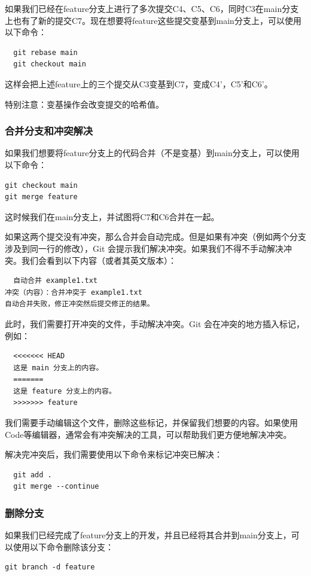 \documentclass[../main.tex]{subfiles}
\begin{document}
如果我们已经在feature分支上进行了多次提交C4、C5、C6，同时C3在main分支上也有了新的提交C7。现在想要将feature这些提交变基到main分支上，可以使用以下命令：
\begin{verbatim}
  git rebase main
  git checkout main
\end{verbatim}
这样会把上述feature上的三个提交从C3变基到C7，变成C4'，C5'和C6'。

特别注意：变基操作会改变提交的哈希值。

\subsubsection{合并分支和冲突解决}

如果我们想要将feature分支上的代码合并（不是变基）到main分支上，可以使用以下命令：

\begin{verbatim}
git checkout main
git merge feature
\end{verbatim}

这时候我们在main分支上，并试图将C7和C6合并在一起。

如果这两个提交没有冲突，那么合并会自动完成。但是如果有冲突（例如两个分支涉及到同一行的修改），Git 会提示我们解决冲突。如果我们不得不手动解决冲突。我们会看到以下内容（或者其英文版本）：
\begin{verbatim}
  自动合并 example1.txt
冲突（内容）：合并冲突于 example1.txt
自动合并失败，修正冲突然后提交修正的结果。
\end{verbatim}
此时，我们需要打开冲突的文件，手动解决冲突。Git 会在冲突的地方插入标记，例如：
\begin{verbatim}
  <<<<<<< HEAD
  这是 main 分支上的内容。
  =======
  这是 feature 分支上的内容。
  >>>>>>> feature
\end{verbatim}
我们需要手动编辑这个文件，删除这些标记，并保留我们想要的内容。如果使用Code等编辑器，通常会有冲突解决的工具，可以帮助我们更方便地解决冲突。

解决完冲突后，我们需要使用以下命令来标记冲突已解决：
\begin{verbatim}
  git add .
  git merge --continue
\end{verbatim}

\subsubsection{删除分支}

如果我们已经完成了feature分支上的开发，并且已经将其合并到main分支上，可以使用以下命令删除该分支：
\begin{verbatim}
git branch -d feature
\end{verbatim}
\end{document}
